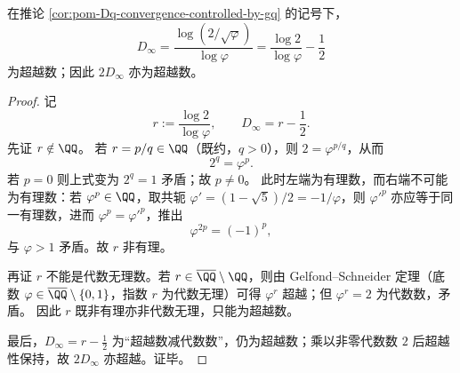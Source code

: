 \begin{theorem}\label{thm:pom-Dinfty-transcendence}
在推论 \ref{cor:pom-Dq-convergence-controlled-by-gq} 的记号下，
\[
D_\infty
=\frac{\log(2/\sqrt{\varphi})}{\log\varphi}
=\frac{\log 2}{\log\varphi}-\frac12
\]
为超越数；因此 \(2D_\infty\) 亦为超越数。
\end{theorem}
\begin{proof}
记
\[
r:=\frac{\log 2}{\log\varphi},
\qquad
D_\infty=r-\frac12.
\]
先证 \(r\notin\QQ\)。
若 \(r=p/q\in\QQ\)（既约，\(q>0\)），则 \(2=\varphi^{p/q}\)，从而
\[
2^q=\varphi^p.
\]
若 \(p=0\) 则上式变为 \(2^q=1\) 矛盾；故 \(p\neq 0\)。
此时左端为有理数，而右端不可能为有理数：若 \(\varphi^p\in\QQ\)，取共轭 \(\varphi'=(1-\sqrt5)/2=-1/\varphi\)，则 \(\varphi'^p\) 亦应等于同一有理数，进而 \(\varphi^p=\varphi'^p\)，推出
\[
\varphi^{2p}=(-1)^p,
\]
与 \(\varphi>1\) 矛盾。故 \(r\) 非有理。

再证 \(r\) 不能是代数无理数。若 \(r\in\overline{\QQ}\setminus\QQ\)，则由 Gelfond--Schneider 定理（底数 \(\varphi\in\overline{\QQ}\setminus\{0,1\}\)，指数 \(r\) 为代数无理）可得 \(\varphi^r\) 超越；但 \(\varphi^r=2\) 为代数数，矛盾。
因此 \(r\) 既非有理亦非代数无理，只能为超越数。

最后，\(D_\infty=r-\frac12\) 为“超越数减代数数”，仍为超越数；乘以非零代数数 \(2\) 后超越性保持，故 \(2D_\infty\) 亦超越。证毕。\cite{Baker1975TranscendentalNumberTheory}
\end{proof}
